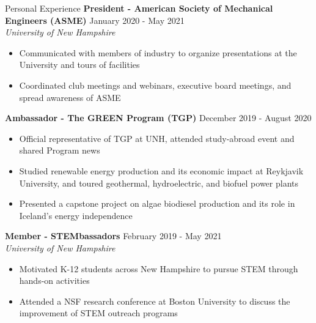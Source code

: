 \documentclass{resume}
\begin{document}
\begin{rSection}{Personal Experience}
    {\bf President - American Society of Mechanical Engineers (ASME)} \hfill {January 2020 - May 2021}
    \\ {\em University of New Hampshire}
    \vspace{-0.5em}
    \begin{itemize}[label={\tiny\raisebox{1ex}{\textbullet}}, noitemsep]
        \item Communicated with members of industry to organize presentations at the University and tours of facilities
        \item Coordinated club meetings and webinars, executive board meetings, and spread awareness of ASME
    \end{itemize}
    \vspace{-0.4em}
    {\bf Ambassador - The GREEN Program (TGP)} \hfill {December 2019 - August 2020}
    \vspace{-0.5em}
    \begin{itemize}[label={\tiny\raisebox{1ex}{\textbullet}}, noitemsep]
        \item Official representative of TGP at UNH, attended study-abroad event and shared Program news
        \item Studied renewable energy production and its economic impact at Reykjavik University, and toured geothermal, hydroelectric, and biofuel power plants
        \item Presented a capstone project on algae biodiesel production and its role in Iceland's energy independence
    \end{itemize}
    \vspace{-0.4em}
    {\bf Member - STEMbassadors} \hfill {{February 2019 - May 2021}}
    \\ {\em University of New Hampshire}
    \vspace{-0.5em}
    \begin{itemize}[label={\tiny\raisebox{1ex}{\textbullet}}, noitemsep]
        \item Motivated K-12 students across New Hampshire to pursue STEM through hands-on activities
        \item Attended a NSF research conference at Boston University to discuss the improvement of STEM outreach programs
    \end{itemize}
    \vspace{-0.4em}
\end{rSection}
\end{document}
